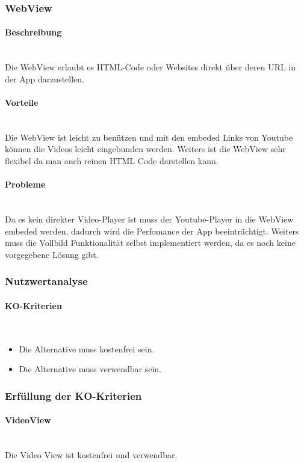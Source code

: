 \documentclass[FIPLY_base.tex]{subfiles}
\begin{document}
\subsubsection{WebView}
\paragraph{Beschreibung}\ \\
Die WebView erlaubt es HTML-Code oder Websites direkt über deren URL in der App darzustellen.
\paragraph{Vorteile}\ \\
Die WebView ist leicht zu benützen und mit den embeded Links von Youtube können die Videos leicht eingebunden werden. Weiters ist die WebView sehr flexibel da man auch reinen HTML Code darstellen kann.
\paragraph{Probleme}\ \\
Da es kein direkter Video-Player ist muss der Youtube-Player in die WebView embeded werden, dadurch wird die Perfomance der App beeinträchtigt. Weiters muss die Vollbild Funktionalität selbst implementiert werden, da es noch keine vorgegebene Lösung gibt.


\subsubsection{Nutzwertanalyse}
\paragraph{KO-Kriterien}\ \\
\begin{itemize}
\item Die Alternative muss kostenfrei sein.
\item Die Alternative muss verwendbar sein.
\end{itemize}
\subsubsection{Erfüllung der KO-Kriterien}
\paragraph{VideoView}\ \\
Die Video View ist kostenfrei und verwendbar.
\end{document}
